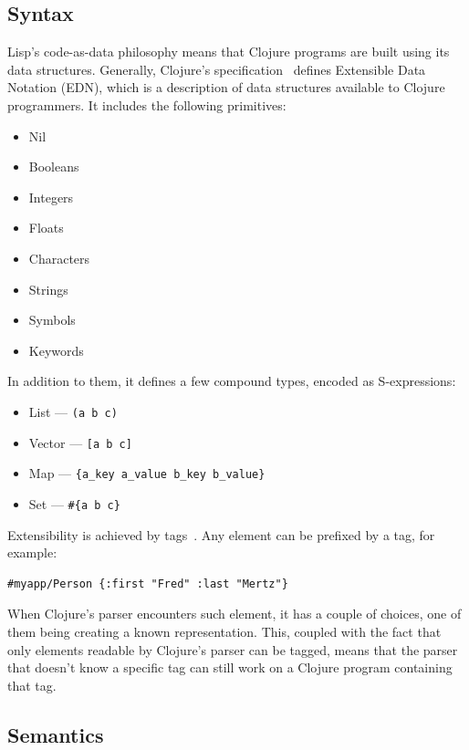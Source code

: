 \documentclass[11pt]{scrartcl}
\begin{document}
\subsection{Syntax}
Lisp’s code-as-data philosophy means that Clojure programs are built using its
data structures.
Generally, Clojure’s specification~\cite{clojure_spec} defines Extensible Data Notation
(EDN), which is a description of data structures available to Clojure
programmers.
It includes the following primitives:
\begin{itemize}
  \item Nil
  \item Booleans
  \item Integers
  \item Floats
  \item Characters
  \item Strings
  \item Symbols
  \item Keywords
\end{itemize}
In addition to them, it defines a few compound types, encoded as S-expressions:
\begin{itemize}
  \item List --- \lstinline$(a b c) $
  \item Vector --- \lstinline$[a b c]$
  \item Map --- \lstinline${a_key a_value b_key b_value}$
  \item Set --- \lstinline$#{a b c}$
\end{itemize}
Extensibility is achieved by tags~\cite{edn_format}. Any element can be
prefixed by a tag, for example:
\begin{lstlisting}
#myapp/Person {:first "Fred" :last "Mertz"} 
\end{lstlisting}
When Clojure’s parser encounters such element, it has a couple of choices, one
of them being creating a known representation.
This, coupled with the fact that only elements readable by Clojure’s parser can
be tagged, means that the parser that doesn’t know a specific tag can still work
on a Clojure program containing that tag.


\subsection{Semantics}
\end{document}
